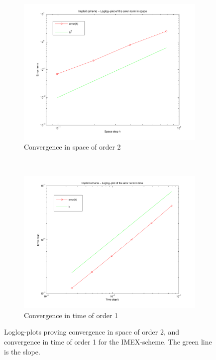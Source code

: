 \begin{figure}[H]
        \centering
        \begin{subfigure}[b]{0.52\textwidth}
                \includegraphics[width=\textwidth]{../PDFs/IMEX/IMEX_space_conv.pdf}
                \caption{Convergence in space of order 2}
                \label{fig:convSpace}
        \end{subfigure}%
        ~ %
        \begin{subfigure}[b]{0.52\textwidth}
                \includegraphics[width=\textwidth]{../PDFs/IMEX/IMEX_time_conv.pdf}
                \caption{Convergence in time of order 1}
                \label{fig:convTime}
        \end{subfigure}
        \caption{Loglog-plots proving convergence in space of order 2, and convergence in time of order 1 for the IMEX-scheme. The green line is the slope.}\label{fig:convergence}
\end{figure}

